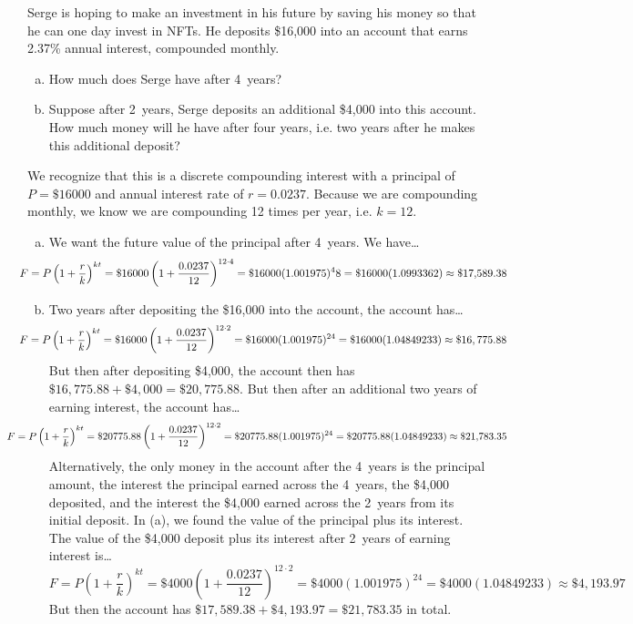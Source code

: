 \documentclass[11pt,letterpaper]{article}
\begin{document}

 Serge is hoping to make an investment in his future by saving his money so that he can one day invest in NFTs. He deposits \$16,000 into an account that earns 2.37\% annual interest, compounded monthly.
	\begin{enumerate}[(a)]
	\item How much does Serge have after 4~years?
	\item Suppose after 2~years, Serge deposits an additional \$4,000 into this account. How much money will he have after four years, i.e. two years after he makes this additional deposit? 
	\end{enumerate} \pspace

\sol We recognize that this is a discrete compounding interest with a principal of $P= \$16000$ and annual interest rate of $r= 0.0237$. Because we are compounding monthly, we know we are compounding 12 times per year, i.e. $k= 12$. 
\begin{enumerate}[(a)]
\item We want the future value of the principal after 4~years. We have\dots
	\[
	\hspace{-1cm} F= P \left(1 + \dfrac{r}{k} \right)^{kt}= \$16000 \left(1 + \dfrac{0.0237}{12} \right)^{12 \cdot 4}= \$16000 (1.001975)^48= \$16000 (1.0993362) \approx \$17,\!589.38
	\] \pspace

\item Two years after depositing the \$16,000 into the account, the account has\dots
	\[
	\hspace{-1cm} F= P \left(1 + \dfrac{r}{k} \right)^{kt}= \$16000 \left(1 + \dfrac{0.0237}{12} \right)^{12 \cdot 2}= \$16000 (1.001975)^{24}= \$16000 (1.04849233) \approx \$16,775.88
	\]
But then after depositing \$4,000, the account then has $\$16,775.88 + \$4,000= \$20,775.88$. But then after an additional two years of earning interest, the account has\dots
	\[
	\hspace{-1.5cm} F= P \left(1 + \dfrac{r}{k} \right)^{kt}= \$20775.88 \left(1 + \dfrac{0.0237}{12} \right)^{12 \cdot 2}= \$20775.88 (1.001975)^{24}= \$20775.88(1.04849233) \approx \$21,\!783.35
	\]
Alternatively, the only money in the account after the 4~years is the principal amount, the interest the principal earned across the 4~years, the \$4,000 deposited, and the interest the \$4,000 earned across the 2~years from its initial deposit. In (a), we found the value of the principal plus its interest. The value of the \$4,000 deposit plus its interest after 2~years of earning interest is\dots
	\[
	F= P \left(1 + \dfrac{r}{k} \right)^{kt}= \$4000 \left(1 + \dfrac{0.0237}{12} \right)^{12 \cdot 2}= \$4000 (1.001975)^{24}= \$4000 (1.04849233) \approx \$4,\!193.97
	\]
But then the account has $\$17,589.38 + \$4,193.97= \$21,783.35$ in total. 
\end{enumerate}
\end{document}
